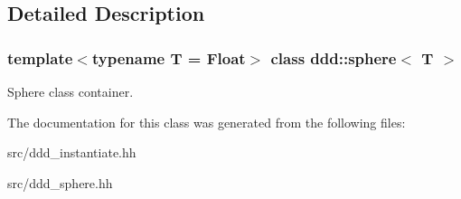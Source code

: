 \subsection{Detailed Description}
\subsubsection*{template$<$typename T = Float$>$\newline
class ddd\+::sphere$<$ T $>$}

Sphere class container. 

The documentation for this class was generated from the following files\+:\begin{DoxyCompactItemize}
\item 
src/ddd\+\_\+instantiate.\+hh\item 
src/ddd\+\_\+sphere.\+hh\end{DoxyCompactItemize}
